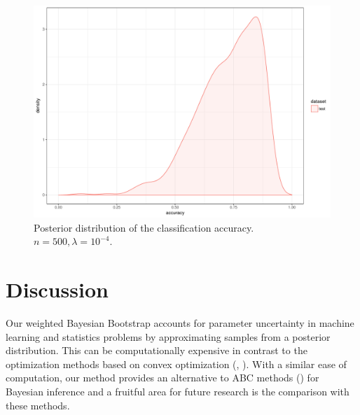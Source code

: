 \documentclass[11pt]{article}%
\begin{document}
\begin{figure}
	\centering
	\includegraphics[width=0.7\linewidth]{acc}
	\caption{Posterior distribution of the classification accuracy. $n=500, \lambda=10^{-4}$.}
	\label{fig:acc}
\end{figure}



\section{Discussion}
Our weighted Bayesian Bootstrap accounts for parameter uncertainty in machine learning and statistics problems by approximating samples from a posterior distribution. This can be computationally expensive in contrast to the optimization methods based on convex optimization (\cite{parikh2013proximal}, \cite{polson2015proximal}). With a similar ease of computation, our method provides an alternative to ABC methods (\cite{beaumont2009adaptive}) for Bayesian inference and a fruitful area for future research is the comparison with these methods.

\nocite{*}

\end{document}
